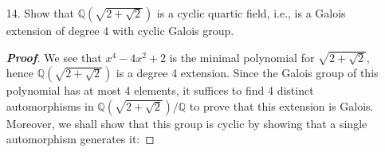 \documentclass[12pt,leqno]{article}
\theoremstyle{definition}
\newcommand{\Q}{\mathbb{Q}}
\newcommand{\R}{\mathbb{R}}
\newenvironment{Proof}{\begin{proof}[\textnormal{\textbf{Proof}}]}{\end{proof}}
\begin{document}
\begin{enumerate}
\begin{Proof}
     Note first that, if $p(x)$ is a polynomial with real coefficients, then $p(z)=0$ if and only if $p(\overline{z})=0$, where $\overline{z}$ denotes the complex conjugate of $z$, i.e., if $z=x+iy$, then $\overline{z}=x-iy$. To see this, write \[p(x)=a_0+a_1x+\hdots+a_nx^n\] and suppose $z$ is any root of $p(x)$. Since $a_0,a_1,\hdots,a_n$ are real, we have \begin{align*}p(\overline{z})&=a_0+a_1\overline{z}+\hdots+a_n\overline{z}^n\\&=\overline{a_0}+\overline{a_1z}+\hdots+\overline{a_nz^n}\\&=\overline{a_0+a_1z+\hdots+a_nz^n}\\&=\overline{0}\\&=0\end{align*} Suppose now that $p(x)$ is a cubic whose Galois group is the cyclic group of order 3. Let $r$ denote a real root of $p(x)$. We see that $p(x)$ must be irreducible, for otherwise we would not have a Galois group of order 3. Moreover, the splitting field of $p(x)$ must be $\Q(r)$, which is a subfield of $\R$, hence $p(x)$ has only real roots.
    \end{Proof}
   \item [14.] Show that $\Q(\sqrt{2+\sqrt{2}})$ is a cyclic quartic field, i.e., is a Galois extension of degree 4 with cyclic Galois group.
    \begin{Proof}
     We see that $x^4-4x^2+2$ is the minimal polynomial for $\sqrt{2+\sqrt{2}}$, hence $\Q(\sqrt{2+\sqrt{2}})$ is a degree 4 extension. Since the Galois group of this polynomial has at most 4 elements, it suffices to find 4 distinct automorphisms in $\Q(\sqrt{2+\sqrt{2}})/\Q$ to prove that this extension is Galois. Moreover, we shall show that this group is cyclic by showing that a single automorphism generates it:


\end{Proof}
\end{enumerate}
\end{document}
